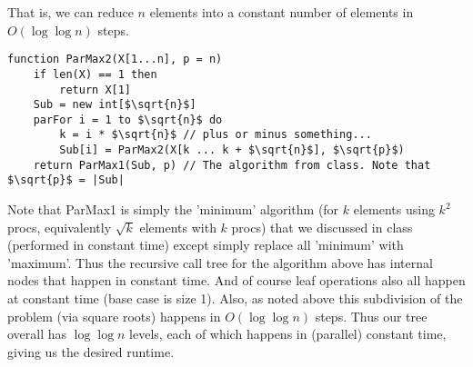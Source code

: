 \documentclass{article}
\begin{document}
That is, we can reduce $n$ elements into a constant number of elements in $O(\log \log n)$ steps.

\begin{lstlisting}
function ParMax2(X[1...n], p = n)
    if len(X) == 1 then
        return X[1]
    Sub = new int[$\sqrt{n}$]
    parFor i = 1 to $\sqrt{n}$ do
        k = i * $\sqrt{n}$ // plus or minus something...
        Sub[i] = ParMax2(X[k ... k + $\sqrt{n}$], $\sqrt{p}$)
    return ParMax1(Sub, p) // The algorithm from class. Note that $\sqrt{p}$ = |Sub|
\end{lstlisting}

Note that ParMax1 is simply the 'minimum' algorithm (for $k$ elements using $k^2$ procs, equivalently $\sqrt{k}$ elements with $k$ procs) that we discussed in class (performed in constant time) except simply replace all 'minimum' with 'maximum'. Thus the recursive call tree for the algorithm above has internal nodes that happen in constant time. And of course leaf operations also all happen at constant time (base case is size 1). Also, as noted above this subdivision of the problem (via square roots) happens in $O(\log \log n)$ steps. Thus our tree overall has $\log \log n$ levels, each of which happens in (parallel) constant time, giving us the desired runtime. 
\end{document}
